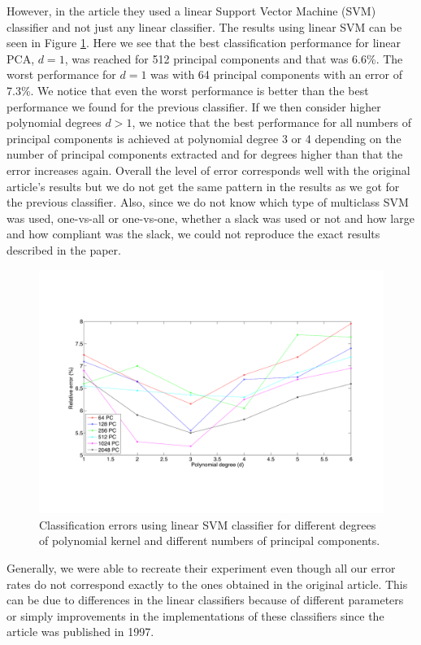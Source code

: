 However, in the article \citep{scholkopf1997kernel} they used a linear Support Vector Machine (SVM) classifier and not just any linear classifier. The results using linear SVM can be seen in Figure \ref{fig:SVM}. Here we see that the best classification performance for linear PCA, $d=1$, was reached for 512 principal components and that was 6.6\%. The worst performance for $d=1$ was with 64 principal components with an error of 7.3\%. We notice that even the worst performance is better than the best performance we found for the previous classifier. If we then consider higher polynomial degrees $d>1$, we notice that the best performance for all numbers of principal components is achieved at polynomial degree 3 or 4 depending on the number of principal components extracted and for degrees higher than that the error increases again. Overall the level of error corresponds well with the original article's results but we do not get the same pattern in the results as we got for the previous classifier.
Also, since we do not know which type of multiclass SVM was used, one-vs-all or one-vs-one, whether a slack was used or not and how large and how compliant was the slack, we could not reproduce the exact results described in the paper.

\begin{figure}
    \centering
    \includegraphics[width=\textwidth]{img/errorplotSVMclass.pdf}
    \caption{Classification errors using linear SVM classifier for different degrees of polynomial kernel and different numbers of principal components.}
    \label{fig:SVM}
\end{figure}


Generally, we were able to recreate their experiment even though all our error rates do not correspond exactly to the ones obtained in the original article. This can be due to differences in the linear classifiers because of different parameters or simply improvements in the implementations of these classifiers since the article was published in 1997.